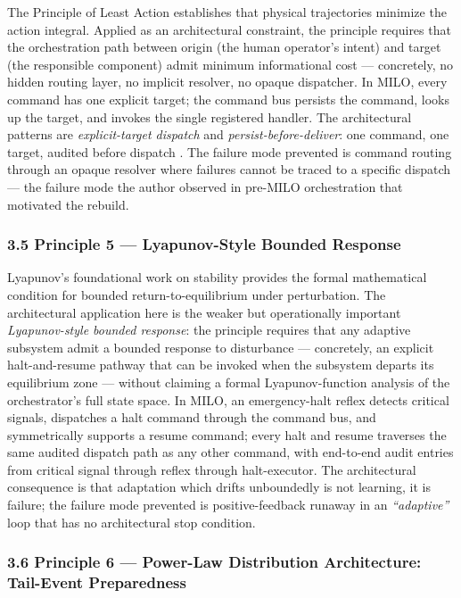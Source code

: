 The Principle of Least Action establishes that physical trajectories
minimize the action integral. Applied as an architectural constraint,
the principle requires that the orchestration path between origin (the
human operator's intent) and target (the responsible component) admit
minimum informational cost --- concretely, no hidden routing layer, no
implicit resolver, no opaque dispatcher. In MILO, every command has one
explicit target; the command bus persists the command, looks up the
target, and invokes the single registered handler. The architectural
patterns are \emph{explicit-target dispatch} and
\emph{persist-before-deliver}: one command, one target, audited before
dispatch \cite{ref1}. The failure mode prevented is command routing through
an opaque resolver where failures cannot be traced to a specific
dispatch --- the failure mode the author observed in pre-MILO
orchestration that motivated the rebuild.

\subsubsection{3.5 Principle 5 --- Lyapunov-Style Bounded
Response}\label{principle-5-lyapunov-style-bounded-response}

Lyapunov's foundational work on stability \cite{ref8} provides the formal
mathematical condition for bounded return-to-equilibrium under
perturbation. The architectural application here is the weaker but
operationally important \emph{Lyapunov-style bounded response}: the
principle requires that any adaptive subsystem admit a bounded response
to disturbance --- concretely, an explicit halt-and-resume pathway that
can be invoked when the subsystem departs its equilibrium zone ---
without claiming a formal Lyapunov-function analysis of the
orchestrator's full state space. In MILO, an emergency-halt reflex
detects critical signals, dispatches a halt command through the command
bus, and symmetrically supports a resume command; every halt and resume
traverses the same audited dispatch path as any other command, with
end-to-end audit entries from critical signal through reflex through
halt-executor. The architectural consequence is that adaptation which
drifts unboundedly is not learning, it is failure; the failure mode
prevented is positive-feedback runaway in an \emph{``adaptive''} loop
that has no architectural stop condition.

\subsubsection{3.6 Principle 6 --- Power-Law Distribution Architecture:
Tail-Event
Preparedness}\label{principle-6-power-law-distribution-architecture-tail-event-preparedness}

